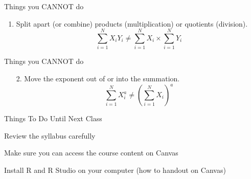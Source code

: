 \documentclass{./../div_teaching_slides}
\begin{document}
\begin{frame}{Things you CANNOT do}
\begin{enumerate}
\item Split apart (or combine) products (multiplication) or quotients (division).
$$ \sum_{i=1}^N X_i Y_i \neq  \sum_{i=1}^N X_i \times \sum_{i=1}^N Y_i   $$
\end{enumerate}
\end{frame}

\begin{frame}{Things you CANNOT do}
\begin{enumerate}
\item[2.] Move the exponent out of or into the summation.
$$ \sum_{i=1}^N X_i^a \neq  \left(\sum_{i=1}^N X_i\right)^a $$
\end{enumerate}
\end{frame}

\begin{frame}{Things To Do Until Next Class}
\begin{wenumerate}
\item Review the syllabus carefully
\item Make sure you can access the course content on Canvas 
\item Install R and R Studio on your computer (how to handout on Canvas)
\end{wenumerate}
\end{frame}
\end{document}
